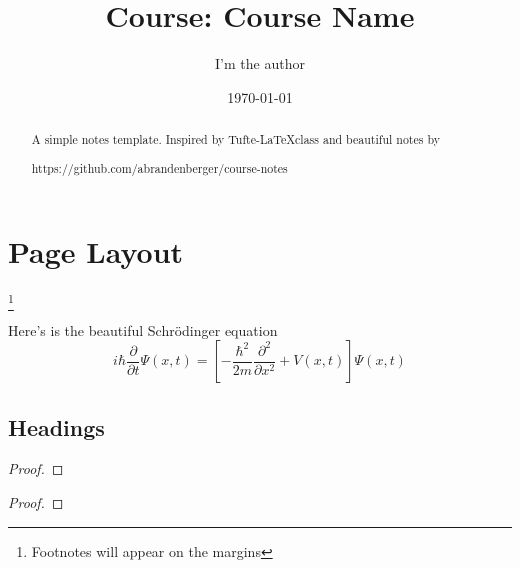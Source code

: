 \documentclass{tufte-handout}
\title{\centering Course:  Course Name}
\author{I'm the author}
\date{\today} %
\begin{document}
\maketitle%

\begin{abstract}
\noindent
A simple notes template. Inspired by Tufte-\LaTeX class and beautiful notes by \begin{verbatim*}
	https://github.com/abrandenberger/course-notes
\end{verbatim*}
\end{abstract}



\section{Page Layout}\label{sec:page-layout}

\lipsum[1][1-8]\footnote[1]{Footnotes will appear on the margins}

\begin{definition}%
	Here's is the beautiful Schr\"odinger equation
	\[ i\hbar {\frac {\partial }{\partial t}}\Psi (x,t)=
	\left[-{\frac {\hbar ^{2}}{2m}}{\frac {\partial ^{2}}{\partial x^{2}}}+V(x,t)\right]\Psi (x,t)\]
\end{definition}

\subsection{Headings}\label{sec:headings}


\begin{theorem}%
	\lipsum[1][1-3] %
\end{theorem}

\begin{lemma}%
	\lipsum[1][1-3] %
	
\end{lemma}
\begin{proof}
	\lipsum[1][1-5]
\end{proof}


\begin{corollary}%
	\lipsum[1][1-3] %
\end{corollary}

\begin{proposition}
	\lipsum[1][1-3] %
\end{proposition}
\begin{problem}
	\lipsum[1][1-2]
\end{problem}

\begin{proof}
	\lipsum*[1]
\end{proof}
\end{document}
